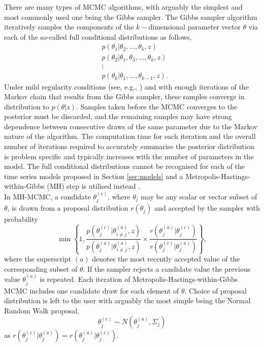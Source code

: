\documentclass[12pt,a4paper]{article}\usepackage[]{graphicx}\usepackage[]{color}
\begin{document}
There are many types of MCMC algorithms, with arguably the simplest and most commonly used one being the Gibbs sampler. The Gibbs sampler algorithm iteratively samples the components of the $k-$dimensional parameter vector $\theta$ via each of the so-called full conditional distributions as follows,
\begin{align}
&p(\theta_1 | \theta_2, \dots, \theta_k, z) \nonumber \\
&p(\theta_2 | \theta_1, \theta_3, \dots, \theta_k, z) \nonumber \\
&\vdots \nonumber \\
&p(\theta_k | \theta_1, \dots, \theta_{k-1}, z). \nonumber
\end{align}
Under mild regularity conditions (see, e.g., \citet{Tierney1994}) and with enough iterations of the Markov chain that results from the Gibbs sampler, these samples converge in distribution to $p(\theta | z)$. Samples taken before the MCMC converges to the posterior must be discarded, and the remaining samples may have strong dependence between consecutive draws of the same parameter due to the Markov nature of the algorithm. The computation time for each iteration and the overall number of iterations required to accurately summarise the posterior distribution is problem specific and typically increases with the number of parameters in the model. The full conditional distributions cannot be recognised for each of the time series models proposed in Section \ref{sec:models} and a Metropolis-Hastings-within-Gibbs (MH) step is utilised instead \citep{Gilks1995}.
\\

In MH-MCMC, a candidate $\theta_j^{(c)}$, where $\theta_j$ may be any scalar or vector subset of $\theta$, is drawn from a proposal distribution $r(\theta_j)$ and accepted by the sampler with probability
\begin{equation}
\min \left\{ 1, \frac{p(\theta_j^{(c)} | \theta_{i \neq j}^{(a)}, z)}{p(\theta_j^{(a)} | \theta_{i \neq j}^{(a)}, z)} \times \frac{r(\theta_j^{(a)} | \theta_j^{(c)})}{r(\theta_j^{(c)} | \theta_j^{(a)})} \right\},
\label{MHaccept}
\end{equation}
where the superscript $(a)$ denotes the most recently accepted value of the corresponding subset of $\theta$. If the sampler rejects a candidate value the previous value $\theta_j^{(a)}$ is repeated. Each iteration of Metropolis-Hastings-within-Gibbs MCMC includes one candidate draw for each element of $\theta$. Choice of proposal distribution is left to the user with arguably the most simple being the Normal Random Walk proposal,
\begin{equation}
\theta_j^{(c)} \sim N(\theta_j^{(a)}, \Sigma_j)
\label{RWprop}
\end{equation}
as $r(\theta_j^{(c)} | \theta_j^{(a)}) = r(\theta_j^{(a)} | \theta_j^{(c)})$.
\\
\end{document}
